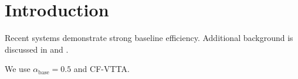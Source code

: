 \section{Introduction}\label{sec:intro}

Recent systems \citep{wang2021tent} demonstrate strong baseline efficiency. Additional background is discussed in \citep{hendrycks2019robustness} and \citep{patel2025ghosttta}.

We use $\alpha_{\text{base}} = 0.5$ and CF-VTTA.
